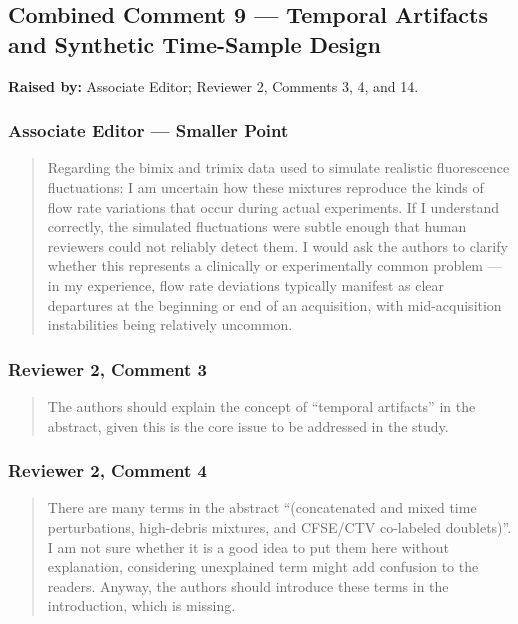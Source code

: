 \documentclass[
  11pt,
  a4paper,
]{article}
\begin{document}
\subsection{Combined Comment 9 --- Temporal Artifacts and Synthetic
Time-Sample
Design}\label{combined-comment-9--temporal-artifacts-and-synthetic-time-sample-design}

\textbf{Raised by:} Associate Editor; Reviewer 2, Comments 3, 4, and 14.

\subsubsection{Associate Editor --- Smaller
Point}\label{associate-editor--smaller-point-1}

\begin{quote}
Regarding the bimix and trimix data used to simulate realistic
fluorescence fluctuations: I am uncertain how these mixtures reproduce
the kinds of flow rate variations that occur during actual experiments.
If I understand correctly, the simulated fluctuations were subtle enough
that human reviewers could not reliably detect them. I would ask the
authors to clarify whether this represents a clinically or
experimentally common problem --- in my experience, flow rate deviations
typically manifest as clear departures at the beginning or end of an
acquisition, with mid-acquisition instabilities being relatively
uncommon.
\end{quote}

\subsubsection{Reviewer 2, Comment 3}\label{reviewer-2-comment-3}

\begin{quote}
The authors should explain the concept of ``temporal artifacts'' in the
abstract, given this is the core issue to be addressed in the study.
\end{quote}

\subsubsection{Reviewer 2, Comment 4}\label{reviewer-2-comment-4}

\begin{quote}
There are many terms in the abstract ``(concatenated and mixed time
perturbations, high-debris mixtures, and CFSE/CTV co-labeled
doublets)''. I am not sure whether it is a good idea to put them here
without explanation, considering unexplained term might add confusion to
the readers. Anyway, the authors should introduce these terms in the
introduction, which is missing.
\end{quote}
\end{document}
